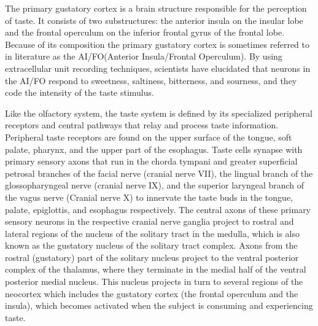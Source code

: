 \documentclass[]{book}
\begin{document}
The primary gustatory cortex is a brain structure responsible for the perception of taste. It consists of two substructures: the anterior insula on the insular lobe and the frontal operculum on the inferior frontal gyrus of the frontal lobe. Because of its composition the primary gustatory cortex is sometimes referred to in literature as the AI/FO(Anterior Insula/Frontal Operculum). By using extracellular unit recording techniques, scientists have elucidated that neurons in the AI/FO respond to sweetness, saltiness, bitterness, and sourness, and they code the intensity of the taste stimulus.

Like the olfactory system, the taste system is defined by its specialized peripheral receptors and central pathways that relay and process taste information. Peripheral taste receptors are found on the upper surface of the tongue, soft palate, pharynx, and the upper part of the esophagus. Taste cells synapse with primary sensory axons that run in the chorda tympani and greater superficial petrosal branches of the facial nerve (cranial nerve VII), the lingual branch of the glossopharyngeal nerve (cranial nerve IX), and the superior laryngeal branch of the vagus nerve (Cranial nerve X) to innervate the taste buds in the tongue, palate, epiglottis, and esophagus respectively. The central axons of these primary sensory neurons in the respective cranial nerve ganglia project to rostral and lateral regions of the nucleus of the solitary tract in the medulla, which is also known as the gustatory nucleus of the solitary tract complex. Axons from the rostral (gustatory) part of the solitary nucleus project to the ventral posterior complex of the thalamus, where they terminate in the medial half of the ventral posterior medial nucleus. This nucleus projects in turn to several regions of the neocortex which includes the gustatory cortex (the frontal operculum and the insula), which becomes activated when the subject is consuming and experiencing taste.
\end{document}
